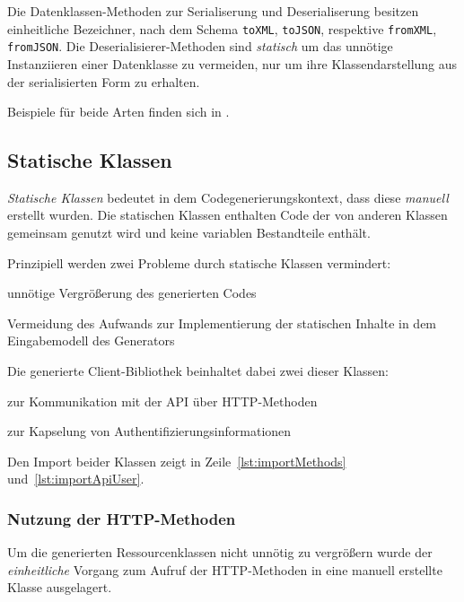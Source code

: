 Die Datenklassen-Methoden zur Serialiserung und Deserialiserung besitzen einheitliche Bezeichner, nach dem Schema \texttt{toXML}, \texttt{toJSON}, respektive \texttt{fromXML}, \texttt{fromJSON}. Die Deserialisierer-Methoden sind \emph{statisch} um das unnötige Instanziieren einer Datenklasse zu vermeiden, nur um ihre Klassendarstellung aus der serialisierten Form zu erhalten.

Beispiele für beide Arten finden sich in .

\subsection{Statische Klassen}
\label{sec:static_classes}

\emph{Statische Klassen} bedeutet in dem Codegenerierungskontext, dass diese \emph{manuell} erstellt wurden. Die statischen Klassen enthalten Code der von anderen Klassen gemeinsam genutzt wird und keine variablen Bestandteile enthält. 

Prinzipiell werden zwei Probleme durch statische Klassen vermindert:
\begin{compactenum}
  \item unnötige Vergrößerung des generierten Codes
  \item Vermeidung des Aufwands zur Implementierung der statischen Inhalte in dem Eingabemodell des Generators
\end{compactenum}

Die generierte Client-Bibliothek beinhaltet dabei zwei dieser Klassen:
\begin{compactenum}
  \item zur Kommunikation mit der \gls{API} über \gls{HTTP}-Methoden
  \item zur Kapselung von Authentifizierungsinformationen
\end{compactenum}

Den Import beider Klassen zeigt  in Zeile~\ref{lst:importMethods} und~\ref{lst:importApiUser}.

\subsubsection{Nutzung der HTTP-Methoden}
\label{sec:staticMethodsClass}

Um die generierten Ressourcenklassen nicht unnötig zu vergrößern wurde der \emph{einheitliche} Vorgang zum Aufruf der \gls{HTTP}-Methoden in eine manuell erstellte Klasse ausgelagert.

